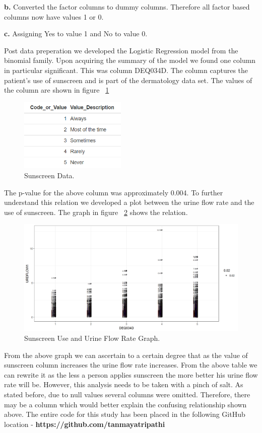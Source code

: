 \documentclass[twoside,11pt]{article}
\begin{document}
\textbf{b.} Converted the factor columns to dummy columns. Therefore all factor based columns now have values 1 or 0.

\textbf{c.} Assigning Yes to value 1 and No to value 0.

\vspace{5mm} Post data preperation we developed the Logistic Regression model from the binomial family. Upon acquiring the summary of the model we found one column in particular significant. This was column DEQ034D. The column captures the patient's use of sunscreen and is part of the dermatology data set. The values of the column are shown in figure ~\ref{fig:Sunscreen_Data}
\begin{figure}[htbp]
  \centering 
  \includegraphics[width=2in]{sunscreen_data.png} 
  \caption{Sunscreen Data.}
  \label{fig:Sunscreen_Data} 
\end{figure} 

The p-value for the above column was approximately 0.004. To further understand this relation we developed a plot between the urine flow rate and the use of sunscreen. The graph in figure ~\ref{fig:Graph_SD} shows the relation.

\begin{figure}[htbp]
  \centering 
  \includegraphics[width=5in]{graph.png} 
  \caption{Sunscreen Use and Urine Flow Rate Graph.}
  \label{fig:Graph_SD} 
\end{figure} 

From the above graph we can ascertain to a certain degree that as the value of sunscreen column increases the urine flow rate increases. From the above table we can rewrite it as the less a person applies sunscreen the more better his urine flow rate will be. However, this analysis needs to be taken with a pinch of salt. As stated before, due to null values several columns were omitted. Therefore, there may be a column which would better explain the confusing relationship shown above.
\vspace{5mm}The entire code for this study has been placed in the following GitHub location - \textbf{https://github.com/tanmayatripathi}
\end{document}
